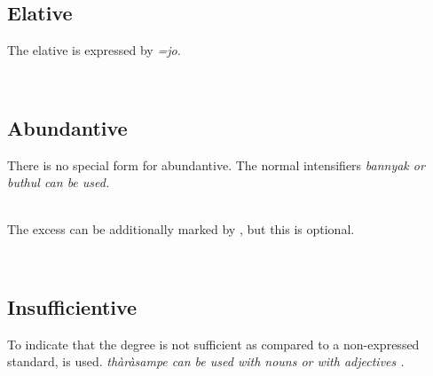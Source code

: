 \subsection{Elative}\label{sec:func:Elative}
The elative is expressed by \em =jo\em.

\\

\subsection{Abundantive}\label{sec:func:Abundantive}
There is no special form for abundantive. The normal intensifiers \em bannyak \em or \em buthul \em can be used.

 \\
The excess can be additionally marked by , but this is optional.

 \\

\subsection{Insufficientive}\label{sec:func:Insufficientive}
To indicate that the degree is not sufficient as compared to a non-expressed standard,  is used. \em thàràsampe \em can be used with nouns or with adjectives .

%
%
%
%

